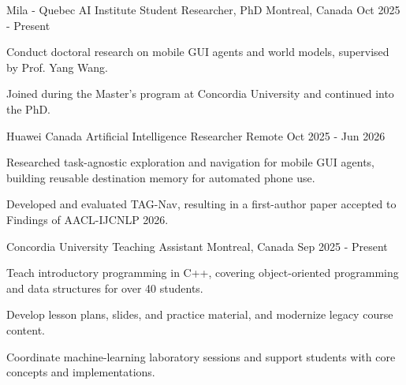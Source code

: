 

\begin{cventries}
  \cventry
    {Mila - Quebec AI Institute} %
    {Student Researcher, PhD} %
    {Montreal, Canada} %
    {Oct 2025 - Present} %
    {
      \begin{cvitems} %
        \item {Conduct doctoral research on mobile GUI agents and world models, supervised by Prof. Yang Wang.}
        \item {Joined during the Master's program at Concordia University and continued into the PhD.}
      \end{cvitems}
    }

  \cventry
    {Huawei Canada} %
    {Artificial Intelligence Researcher} %
    {Remote} %
    {Oct 2025 - Jun 2026} %
    {
      \begin{cvitems} %
        \item {Researched task-agnostic exploration and navigation for mobile GUI agents, building reusable destination memory for automated phone use.}
        \item {Developed and evaluated TAG-Nav, resulting in a first-author paper accepted to Findings of AACL-IJCNLP 2026.}
      \end{cvitems}
    }

  \cventry
    {Concordia University} %
    {Teaching Assistant} %
    {Montreal, Canada} %
    {Sep 2025 - Present} %
    {
      \begin{cvitems} %
        \item {Teach introductory programming in C++, covering object-oriented programming and data structures for over 40 students.}
        \item {Develop lesson plans, slides, and practice material, and modernize legacy course content.}
        \item {Coordinate machine-learning laboratory sessions and support students with core concepts and implementations.}
      \end{cvitems}
    }


\end{cventries}
